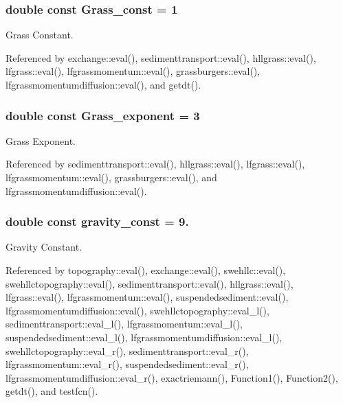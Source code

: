 \subsubsection[{Grass\-\_\-const}]{\setlength{\rightskip}{0pt plus 5cm}double const Grass\-\_\-const = 1}\label{physpara_8cpp_a55113351785dd0a77b6ca3c5666d43cd}


Grass Constant. 



Referenced by exchange\-::eval(), sedimenttransport\-::eval(), hllgrass\-::eval(), lfgrass\-::eval(), lfgrassmomentum\-::eval(), grassburgers\-::eval(), lfgrassmomentumdiffusion\-::eval(), and getdt().

\subsubsection[{Grass\-\_\-exponent}]{\setlength{\rightskip}{0pt plus 5cm}double const Grass\-\_\-exponent = 3}\label{physpara_8cpp_a3ee478f4c8fcdee9225909355e92ca7c}


Grass Exponent. 



Referenced by sedimenttransport\-::eval(), hllgrass\-::eval(), lfgrass\-::eval(), lfgrassmomentum\-::eval(), grassburgers\-::eval(), and lfgrassmomentumdiffusion\-::eval().

\subsubsection[{gravity\-\_\-const}]{\setlength{\rightskip}{0pt plus 5cm}double const gravity\-\_\-const = 9.}\label{physpara_8cpp_a54e0c4147ff3791a9c2ecb31981976be}


Gravity Constant. 



Referenced by topography\-::eval(), exchange\-::eval(), swehllc\-::eval(), swehllctopography\-::eval(), sedimenttransport\-::eval(), hllgrass\-::eval(), lfgrass\-::eval(), lfgrassmomentum\-::eval(), suspendedsediment\-::eval(), lfgrassmomentumdiffusion\-::eval(), swehllctopography\-::eval\-\_\-l(), sedimenttransport\-::eval\-\_\-l(), lfgrassmomentum\-::eval\-\_\-l(), suspendedsediment\-::eval\-\_\-l(), lfgrassmomentumdiffusion\-::eval\-\_\-l(), swehllctopography\-::eval\-\_\-r(), sedimenttransport\-::eval\-\_\-r(), lfgrassmomentum\-::eval\-\_\-r(), suspendedsediment\-::eval\-\_\-r(), lfgrassmomentumdiffusion\-::eval\-\_\-r(), exactriemann(), Function1(), Function2(), getdt(), and testfcn().

